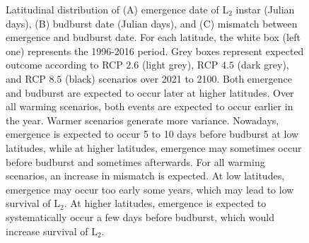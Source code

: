 \documentclass[12 pt]{article}
\begin{document}
\begin{figure}
    \centering
    \caption{Latitudinal distribution of (A) emergence date of $\text{L}_2$ instar (Julian days), (B) budburst date (Julian days), and (C) mismatch between emergence and budburst date. For each latitude, the white box (left one) represents the 1996-2016 period. Grey boxes represent expected outcome according to RCP $2.6$ (light grey), RCP $4.5$ (dark grey), and RCP $8.5$ (black) scenarios over 2021 to 2100.  Both emergence and budburst are expected to occur later at higher latitudes. Over all warming scenarios, both events are expected to occur earlier in the year. Warmer scenarios generate more variance. Nowadays, emergence is expected to occur 5 to 10 days before budburst at low latitudes, while at higher latitudes, emergence may sometimes occur before budburst and sometimes afterwards.  For all warming scenarios, an increase in mismatch is expected. At low latitudes, emergence may occur too early some years, which may lead to low survival of $\text{L}_2$. At higher latitudes, emergence is expected to systematically occur a few days before budburst, which would increase survival of $\text{L}_2$.}
\end{figure}
\end{document}
